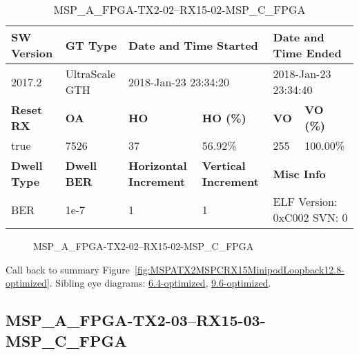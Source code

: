 \begin{table}[h]
\centering
\caption{MSP\_A\_FPGA-TX2-02--RX15-02-MSP\_C\_FPGA}
\label{tab:MSPAFPGATX202RX1502MSPCFPGA12.8-optimized}
\begin{tabular}{@{}|l|l|l|l|l|l|@{}}
\toprule
\textbf{SW Version}                & \textbf{GT Type}   & \multicolumn{2}{l|}{\textbf{Date and Time Started}}            & \multicolumn{2}{l|}{\textbf{Date and Time Ended}}        \\ \midrule
2017.2                       & UltraScale GTH          & \multicolumn{2}{l|}{2018-Jan-23 23:34:20}                   & \multicolumn{2}{l|}{2018-Jan-23 23:34:40}               \\ \midrule
\textbf{Reset RX}                  & \textbf{OA} & \textbf{HO}   & \textbf{HO (\%)} & \textbf{VO} & \textbf{VO (\%)} \\ \midrule
true & 7526        & 37          & 56.92\%        & 255        & 100.00\%       \\ \midrule
\textbf{Dwell Type}                & \textbf{Dwell BER} & \textbf{Horizontal Increment} & \textbf{Vertical Increment}    & \multicolumn{2}{l|}{\textbf{Misc Info}}                  \\ \midrule
BER                            & 1e-7        & 1        & 1           & \multicolumn{2}{l|}{ELF Version: 0xC002 SVN: 0}                         \\ \bottomrule
\end{tabular}
\end{table}

\begin{figure}[h]
\caption{MSP\_A\_FPGA-TX2-02--RX15-02-MSP\_C\_FPGA} \label{fig:MSPAFPGATX202RX1502MSPCFPGA12.8-optimized}
\end{figure}

Call back to summary Figure~\ref{fig:MSPATX2MSPCRX15MinipodLoopback12.8-optimized}.
Sibling eye diagrams: \hyperref[sec:MSPAFPGATX202RX1502MSPCFPGA6.4-optimized]{6.4-optimized}, \hyperref[sec:MSPAFPGATX202RX1502MSPCFPGA9.6-optimized]{9.6-optimized}.

\clearpage
\newpage


\subsection{MSP\_A\_FPGA-TX2-03--RX15-03-MSP\_C\_FPGA}\label{sec:MSPAFPGATX203RX1503MSPCFPGA12.8-optimized}

